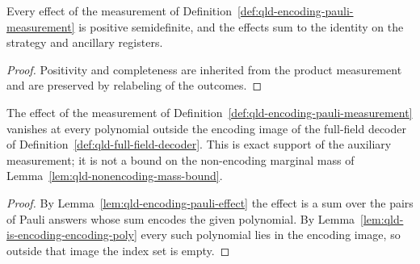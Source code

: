 	\begin{lemma}
		\label{lem:qld-encoding-pauli-complete}
		\leanok
		Every effect of the measurement of
		Definition~\ref{def:qld-encoding-pauli-measurement} is positive
		semidefinite, and the effects sum to the identity on the strategy and
		ancillary registers.
	\end{lemma}
	\begin{proof}
		\leanok
		Positivity and completeness are inherited from the product measurement and
		are preserved by relabeling of the outcomes.
	\end{proof}

	\begin{lemma}
		\label{lem:qld-encoding-pauli-support}
		\leanok
		The effect of the measurement of
		Definition~\ref{def:qld-encoding-pauli-measurement} vanishes at every
		polynomial outside the encoding image of the full-field decoder of
		Definition~\ref{def:qld-full-field-decoder}. This is exact support of the
		auxiliary measurement; it is not a bound on the non-encoding marginal mass
		of Lemma~\ref{lem:qld-nonencoding-mass-bound}.
	\end{lemma}
	\begin{proof}
		\leanok
		By Lemma~\ref{lem:qld-encoding-pauli-effect} the effect is a sum over the
		pairs of Pauli answers whose sum encodes the given polynomial. By
		Lemma~\ref{lem:qld-is-encoding-encoding-poly} every such polynomial lies in
		the encoding image, so outside that image the index set is empty.
	\end{proof}

